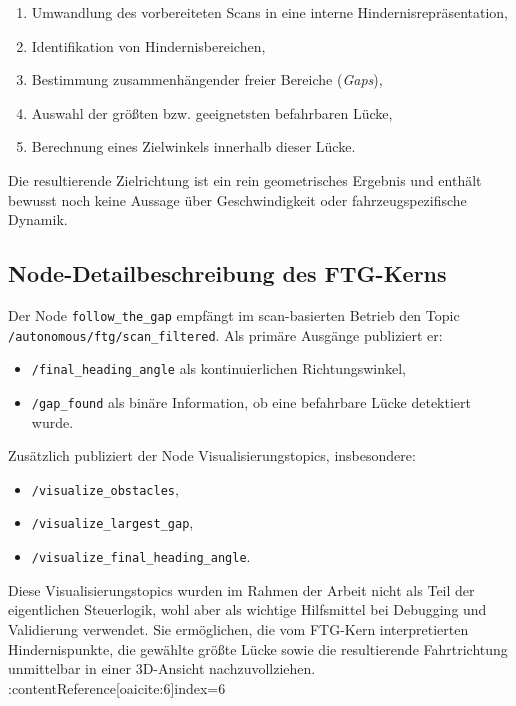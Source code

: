 \begin{enumerate}
    \item Umwandlung des vorbereiteten Scans in eine interne Hindernisrepräsentation,
    \item Identifikation von Hindernisbereichen,
    \item Bestimmung zusammenhängender freier Bereiche (\textit{Gaps}),
    \item Auswahl der größten bzw. geeignetsten befahrbaren Lücke,
    \item Berechnung eines Zielwinkels innerhalb dieser Lücke.
\end{enumerate}

Die resultierende Zielrichtung ist ein rein geometrisches Ergebnis und enthält bewusst noch keine Aussage über Geschwindigkeit oder fahrzeugspezifische Dynamik.

\subsection{Node-Detailbeschreibung des FTG-Kerns}

Der Node \texttt{follow\_the\_gap} empfängt im scan-basierten Betrieb den Topic \texttt{/autonomous/ftg/scan\_filtered}. Als primäre Ausgänge publiziert er:

\begin{itemize}
    \item \texttt{/final\_heading\_angle} als kontinuierlichen Richtungswinkel,
    \item \texttt{/gap\_found} als binäre Information, ob eine befahrbare Lücke detektiert wurde.
\end{itemize}

Zusätzlich publiziert der Node Visualisierungstopics, insbesondere:

\begin{itemize}
    \item \texttt{/visualize\_obstacles},
    \item \texttt{/visualize\_largest\_gap},
    \item \texttt{/visualize\_final\_heading\_angle}.
\end{itemize}

Diese Visualisierungstopics wurden im Rahmen der Arbeit nicht als Teil der eigentlichen Steuerlogik, wohl aber als wichtige Hilfsmittel bei Debugging und Validierung verwendet. Sie ermöglichen, die vom FTG-Kern interpretierten Hindernispunkte, die gewählte größte Lücke sowie die resultierende Fahrtrichtung unmittelbar in einer 3D-Ansicht nachzuvollziehen. :contentReference[oaicite:6]{index=6}

